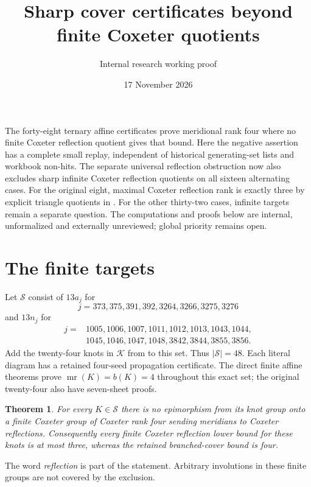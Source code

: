 \documentclass[11pt]{article}
\title{Sharp cover certificates beyond finite Coxeter quotients}
\author{Internal research working proof}
\date{17 November 2026}
\newtheorem{theorem}{Theorem}
\newcommand{\mr}{\operatorname{mr}}
\begin{document}
\maketitle

The forty-eight ternary affine certificates prove meridional rank
four where no finite Coxeter reflection quotient gives that bound.
Here the negative assertion has a complete small replay, independent
of historical generating-set lists and workbook non-hits.
The separate universal reflection obstruction now also excludes
sharp infinite Coxeter reflection quotients on all sixteen alternating
cases. For the original eight, maximal Coxeter reflection rank is
exactly three by
explicit triangle quotients in
.
For the other thirty-two cases, infinite targets remain a separate
question. The computations and proofs below are internal,
unformalized and externally unreviewed; global priority remains open.

\section{The finite targets}

Let $\mathcal S$ consist of $13a_j$ for
\[
 j=373,375,391,392,3264,3266,3275,3276
\]
and $13n_j$ for
\[
\begin{split}
 j={}&1005,1006,1007,1011,1012,1013,1043,1044,\\
     &1045,1046,1047,1048,3842,3844,3855,3856.
\end{split}
\]
Add the twenty-four knots in $\mathcal K$ from
 to this set. Thus $|\mathcal S|=48$.
Each literal diagram has a retained four-seed propagation certificate.
The direct finite affine theorems prove $\mr(K)=b(K)=4$ throughout
this exact set; the original twenty-four also have seven-sheet proofs.

\begin{theorem}\label{thm:finite}
For every $K\in\mathcal S$ there is no epimorphism from its knot group
onto a finite Coxeter group of Coxeter rank four sending meridians to
Coxeter reflections. Consequently every finite Coxeter reflection
lower bound for these knots is at most three, whereas the retained
branched-cover bound is four.
\end{theorem}

The word \emph{reflection} is part of the statement. Arbitrary involutions
in these finite groups are not covered by the exclusion.
\end{document}
